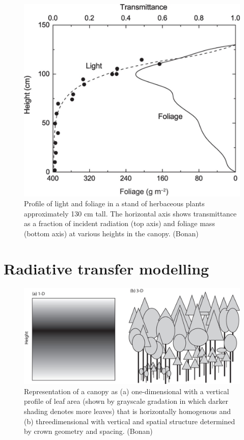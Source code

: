 \documentclass[
  oneside]{book}
\begin{document}
\begin{figure}

{\centering \includegraphics[width=0.8\linewidth]{figures/chap3/f36_obs_profile} 

}

\caption{Profile of light and foliage in a stand of herbaceous plants approximately 130 cm tall. The horizontal axis shows transmittance as a fraction of incident radiation (top axis) and foliage mass (bottom axis) at various heights in the canopy. (Bonan)}\label{fig:f36}
\end{figure}

\hypertarget{radiative-transfer-modelling}{%
\section{Radiative transfer modelling}\label{radiative-transfer-modelling}}

\begin{figure}

{\centering \includegraphics[width=0.8\linewidth]{figures/chap3/f37_RT_principle} 

}

\caption{Representation of a canopy as (a) one-dimensional with a vertical profile of leaf area (shown by grayscale gradation in which darker shading denotes more leaves) that is horizontally homogenous and (b) threedimensional with vertical and spatial structure determined by crown geometry and spacing. (Bonan)}\label{fig:f37}
\end{figure}
\end{document}
